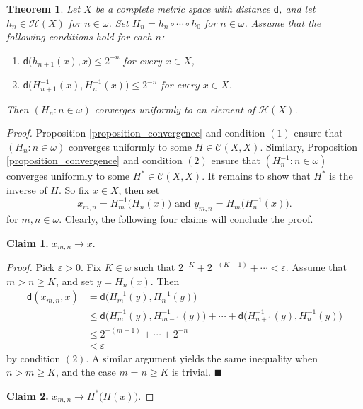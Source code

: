 \documentclass{amsart}
\theoremstyle{plain}
\newtheorem{theorem}{Theorem}[section]
\theoremstyle{definition}
\newcommand{\di}{\mathsf{d}}
\newcommand{\CC}{\mathcal{C}}
\newcommand{\HH}{\mathcal{H}}
\begin{document}
\begin{theorem}\label{theorem_convergence}
Let $X$ be a complete metric space with distance $\di$, and let $h_n\in\HH(X)$ for $n\in\omega$. Set $H_n=h_n\circ\cdots\circ h_0$ for $n\in\omega$. Assume that the following conditions hold for each $n$:
\begin{enumerate}
\item $\di\big(h_{n+1}(x),x\big)\leq 2^{-n}$ for every $x\in X$,
\item $\di\big(H_{n+1}^{-1}(x),H_n^{-1}(x)\big)\leq 2^{-n}$ for every $x\in X$.
\end{enumerate}
Then $(H_n:n\in\omega)$ converges uniformly to an element of $\HH(X)$.
\end{theorem}
\begin{proof}
Proposition \ref{proposition_convergence} and condition $(1)$ ensure that $(H_n:n\in\omega)$ converges uniformly to some $H\in\CC(X,X)$. Similary, Proposition \ref{proposition_convergence} and condition $(2)$ ensure that $(H^{-1}_n:n\in\omega)$ converges uniformly to some $H^\ast\in\CC(X,X)$. It remains to show that $H^\ast$ is the inverse of $H$. So fix $x\in X$, then set
$$
x_{m,n}=H_m^{-1}\big(H_n(x)\big)\text{ and }y_{m,n}=H_m\big(H_n^{-1}(x)\big).
$$
for $m,n\in\omega$. Clearly, the following four claims will conclude the proof.

\noindent\textbf{Claim 1.} $x_{m,n}\to x$.

\noindent\textit{Proof.} Pick $\varepsilon >0$. Fix $K\in\omega$ such that $2^{-K}+2^{-(K+1)}+\cdots <\varepsilon$. Assume that $m>n\geq K$, and set $y=H_n(x)$. Then
\begin{align}
\di(x_{m,n},x)&= \di\big(H_m^{-1}(y),H_n^{-1}(y)\big)\nonumber\\
&\leq\di\big(H_m^{-1}(y),H_{m-1}^{-1}(y)\big)+\cdots +\di\big(H_{n+1}^{-1}(y),H_n^{-1}(y)\big)\nonumber\\
&\leq 2^{-(m-1)}+\cdots +2^{-n}\nonumber\\
&<\varepsilon\nonumber
\end{align}
by condition $(2)$. A similar argument yields the same inequality when $n>m\geq K$, and the case $m=n\geq K$ is trivial. $\blacksquare$

\noindent\textbf{Claim 2.} $x_{m,n}\to H^\ast\big(H(x)\big)$.


\end{proof}
\end{document}
